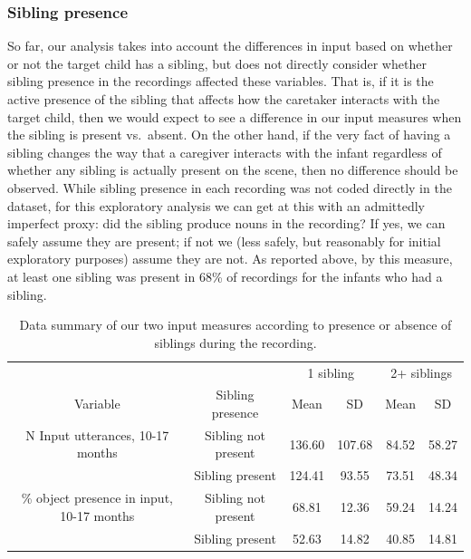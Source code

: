 \documentclass[
  man,mask,floatsintext]{apa6}
\begin{document}
\hypertarget{sibling-presence}{%
\subsubsection{Sibling presence}\label{sibling-presence}}

So far, our analysis takes into account the differences in input based on whether or not the target child has a sibling, but does not directly consider whether sibling presence in the recordings affected these variables. That is, if it is the active presence of the sibling that affects how the caretaker interacts with the target child, then we would expect to see a difference in our input measures when the sibling is present vs.~absent. On the other hand, if the very fact of having a sibling changes the way that a caregiver interacts with the infant regardless of whether any sibling is actually present on the scene, then no difference should be observed. While sibling presence in each recording was not coded directly in the dataset, for this exploratory analysis we can get at this with an admittedly imperfect proxy: did the sibling produce nouns in the recording? If yes, we can safely assume they are present; if not we (less safely, but reasonably for initial exploratory purposes) assume they are not. As reported above, by this measure, at least one sibling was present in 68\% of recordings for the infants who had a sibling.

\begin{table}[!h]

\caption{\label{tab:sib-presence-table-data-summary}Data summary of our two input measures according to presence or absence of siblings during the recording.}
\centering
\begin{tabular}[t]{cccccc}
\toprule
\multicolumn{2}{c}{ } & \multicolumn{2}{c}{1 sibling} & \multicolumn{2}{c}{2+ siblings} \\
\cmidrule(l{3pt}r{3pt}){3-4} \cmidrule(l{3pt}r{3pt}){5-6}
\multicolumn{1}{c}{Variable} & \multicolumn{1}{c}{Sibling presence} & \multicolumn{1}{c}{Mean} & \multicolumn{1}{c}{SD} & \multicolumn{1}{c}{Mean} & \multicolumn{1}{c}{SD} \\
\cmidrule(l{3pt}r{3pt}){1-1} \cmidrule(l{3pt}r{3pt}){2-2} \cmidrule(l{3pt}r{3pt}){3-3} \cmidrule(l{3pt}r{3pt}){4-4} \cmidrule(l{3pt}r{3pt}){5-5} \cmidrule(l{3pt}r{3pt}){6-6}
N Input utterances, 10-17 months & Sibling not present & 136.60 & 107.68 & 84.52 & 58.27\\
 & Sibling present & 124.41 & 93.55 & 73.51 & 48.34\\
\% object presence in input, 10-17 months & Sibling not present & 68.81 & 12.36 & 59.24 & 14.24\\
 & Sibling present & 52.63 & 14.82 & 40.85 & 14.81\\
\bottomrule
\end{tabular}
\end{table}
\end{document}
